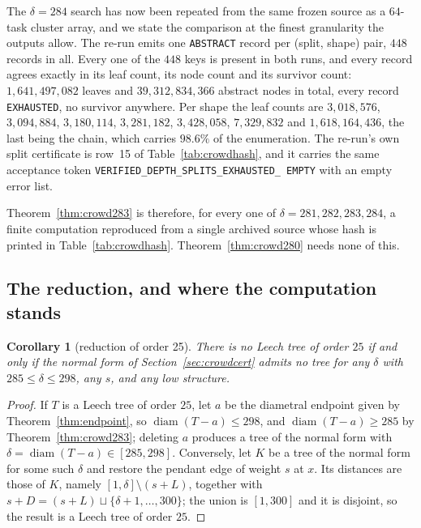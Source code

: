 \documentclass[11pt,a4paper]{article}
\theoremstyle{plain}
\newtheorem{corollary}[theorem]{Corollary}
\theoremstyle{remark}
\newcommand{\diam}{\operatorname{diam}}
\newcommand{\tok}[1]{\texttt{#1}}
\newcommand{\bk}{\discretionary{}{}{}}
\begin{document}
The $\delta=284$ search has now been repeated from the same frozen source as a
$64$-task cluster array, and we state the comparison at the finest granularity
the outputs allow.  The re-run emits one \tok{ABSTRACT} record per (split,
shape) pair, $448$ records in all.  Every one of the $448$ keys is present in
both runs, and every record agrees exactly in its leaf count, its node count and
its survivor count: $1{,}641{,}497{,}082$ leaves and $39{,}312{,}834{,}366$
abstract nodes in total, every record \tok{EXHAUSTED}, no survivor anywhere.
Per shape the leaf counts are $3{,}018{,}576$, $3{,}094{,}884$, $3{,}180{,}114$,
$3{,}281{,}182$, $3{,}428{,}058$, $7{,}329{,}832$ and $1{,}618{,}164{,}436$, the
last being the chain, which carries $98.6\%$ of the enumeration.  The re-run's
own split certificate is row~15 of Table~\ref{tab:crowdhash}, and it carries the
same acceptance token \tok{VERIFIED\_\bk DEPTH\_\bk SPLITS\_\bk EXHAUSTED\_\bk
EMPTY} with an empty error list.

Theorem~\ref{thm:crowd283} is therefore, for every one of $\delta=281,282,283,
284$, a finite computation reproduced from a single archived source whose hash
is printed in Table~\ref{tab:crowdhash}.  Theorem~\ref{thm:crowd280} needs none
of this.

\subsection{The reduction, and where the computation stands}\label{sec:crowdstatus}

\begin{corollary}[reduction of order 25]\label{cor:reduction}
There is no Leech tree of order $25$ if and only if the normal form of
Section~\ref{sec:crowdcert} admits no tree for any $\delta$ with
$285\le\delta\le298$, any $s$, and any low structure.
\end{corollary}

\begin{proof}
If $T$ is a Leech tree of order $25$, let $a$ be the diametral endpoint given by
Theorem~\ref{thm:endpoint}, so $\diam(T-a)\le298$, and $\diam(T-a)\ge285$ by
Theorem~\ref{thm:crowd283}; deleting $a$ produces a tree of the normal form with
$\delta=\diam(T-a)\in[285,298]$.  Conversely, let $K$ be a tree of the normal
form for some such $\delta$ and restore the pendant edge of weight $s$ at $x$.
Its distances are those of $K$, namely $[1,\delta]\setminus(s+L)$, together with
$s+D=(s+L)\sqcup\{\delta+1,\dots,300\}$; the union is $[1,300]$ and it is
disjoint, so the result is a Leech tree of order $25$.
\end{proof}
\end{document}
